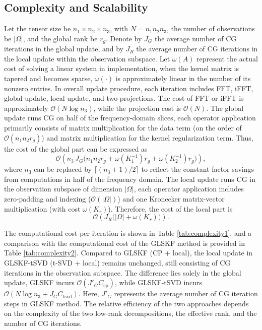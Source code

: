 \documentclass[a4paper,12pt]{article}
\numberwithin{equation}{section}
\numberwithin{algorithm}{section}
\theoremstyle{remark}
\theoremstyle{definition}
\begin{document}
\subsection{Complexity and Scalability}
\label{sec:complexity}
Let the tensor size be $n_1 \times n_2 \times n_3$, with $N = n_1 n_2 n_3$, the number of observations be $|\Omega|$, and the global rank be $r_g$.
Denote by $J_G$ the average number of CG iterations in the global update, and by $J_R$ the average number of CG iterations in the local update within the observation subspace.
{\color{blue}Let $\omega(A)$ represent the actual cost of solving a linear system in implementation}, when the kernel matrix is tapered and becomes sparse, $\omega(\cdot)$ is approximately linear in the number of its nonzero entries.
In overall update procedure, each iteration includes FFT, iFFT, global update, local update, and two projections.
The cost of FFT or iFFT is approximately $\mathcal{O}(N \log n_3)$, while the projection cost is $\mathcal{O}(N)$.
The global update runs CG on half of the frequency-domain slices, {\color{blue}each operator application primarily consists of matrix multiplication for the data term (on the order of $\mathcal{O}(n_1 n_2 r_g)$) and matrix multiplication for the kernel regularization term. Thus, the cost of the global part can be expressed as
\[
\mathcal{O}\!\left(n_3\,J_G\Big(n_1 n_2 r_g + \omega(K_1^{-1}) r_g + \omega(K_2^{-1}) r_g\Big)\right),
\]}
where $n_3$ can be replaced by $\lceil (n_3+1)/2 \rceil$ to reflect the constant factor savings from computations in half of the frequency domain.
The local update runs CG in the observation subspace of dimension $|\Omega|$, each operator application includes zero-padding and indexing ($\mathcal{O}(|\Omega|)$) {\color{blue}and one Kronecker matrix-vector multiplication (with cost $\omega(K_r)$). Therefore, the cost of the local part is
\[
\mathcal{O}\!\left(J_R\big(|\Omega| + \omega(K_r)\big)\right).
\]}

The computational cost per iteration is shown in Table \ref{tab:complexity1}, and a comparison with the computational cost of the GLSKF method is provided in Table \ref{tab:complexity2}. Compared to GLSKF (CP + local), the local update in GLSKF-tSVD (t-SVD + local) remains unchanged, still consisting of CG iterations in the observation subspace. The difference lies solely in the global update, GLSKF incurs $\mathcal{O}(J'_G C_{\mathrm{cp}})$, while GLSKF-tSVD incurs $\mathcal{O}(N \log n_3 + J_G C_{\mathrm{tsvd}})$. Here, $J'_G$ represents the average number of CG iteration steps in GLSKF method. The relative efficiency of the two approaches depends on the complexity of the two low-rank decompositions, the effective rank, and the number of CG iterations.
\end{document}
